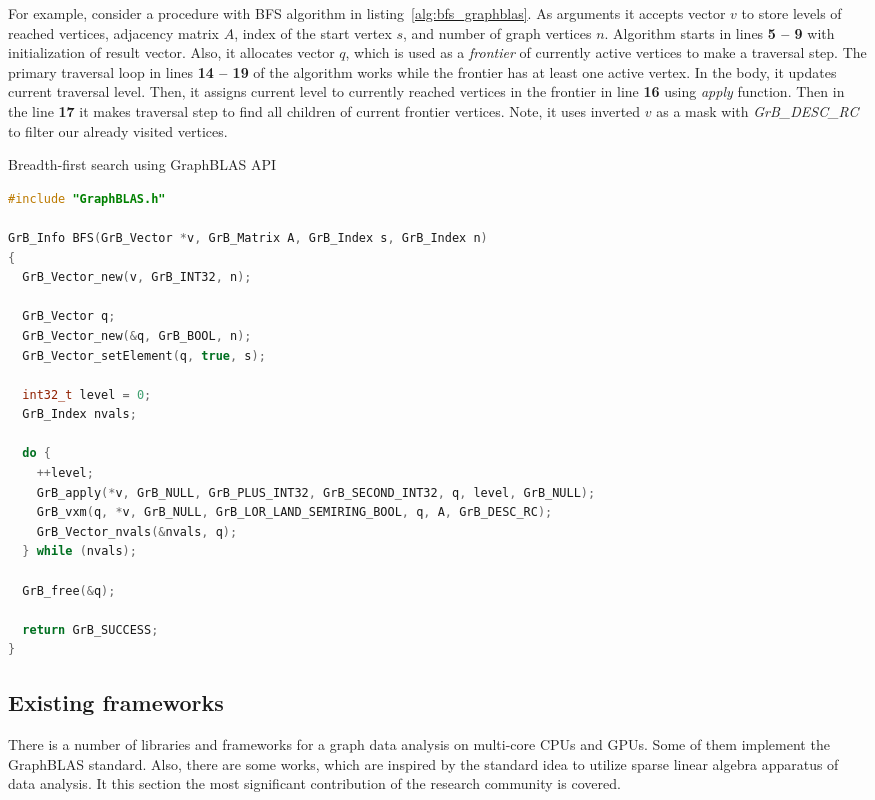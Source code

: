 For example, consider a procedure with BFS algorithm in listing~\ref{alg:bfs_graphblas}. As arguments it accepts vector $v$ to store levels of reached vertices, adjacency matrix $A$, index of the start vertex $s$, and number of graph vertices $n$. Algorithm starts in lines \textbf{5 -- 9} with initialization of result vector. Also, it allocates vector $q$, which is used as a \textit{frontier} of currently active vertices to make a traversal step. The primary traversal loop in lines \textbf{14 -- 19} of the algorithm works while the frontier has at least one active vertex. In the body, it updates current traversal level. Then, it assigns current level to currently reached vertices in the frontier in line \textbf{16} using \textit{apply} function. Then in the line \textbf{17} it makes traversal step to find all children of current frontier vertices. Note, it uses inverted $v$ as a mask with \textit{GrB\_DESC\_RC} to filter our already visited vertices.

\lstset{style=codelistingstyle}

\begin{algorithm}[]
\caption{Breadth-first search using GraphBLAS API}
\label{alg:bfs_graphblas}
\begin{lstlisting}[language=C++]
#include "GraphBLAS.h"

GrB_Info BFS(GrB_Vector *v, GrB_Matrix A, GrB_Index s, GrB_Index n)
{
  GrB_Vector_new(v, GrB_INT32, n);

  GrB_Vector q;
  GrB_Vector_new(&q, GrB_BOOL, n);
  GrB_Vector_setElement(q, true, s); 

  int32_t level = 0;
  GrB_Index nvals;
  
  do {
    ++level;                                               
    GrB_apply(*v, GrB_NULL, GrB_PLUS_INT32, GrB_SECOND_INT32, q, level, GrB_NULL);       
    GrB_vxm(q, *v, GrB_NULL, GrB_LOR_LAND_SEMIRING_BOOL, q, A, GrB_DESC_RC);                           
    GrB_Vector_nvals(&nvals, q);
  } while (nvals);
  
  GrB_free(&q);

  return GrB_SUCCESS;
}
\end{lstlisting}
\end{algorithm}

\subsection{Existing frameworks}

There is a number of libraries and frameworks for a graph data analysis on multi-core CPUs and GPUs. Some of them implement the GraphBLAS standard. Also, there are some works, which are inspired by the standard idea to utilize sparse linear algebra apparatus of data analysis. It this section the most significant contribution of the research community is covered.\\

